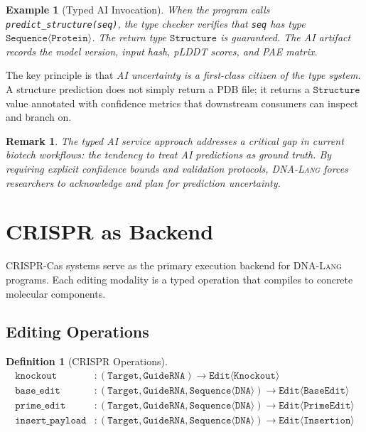 \documentclass[12pt,a4paper]{article}
\newtheorem{definition}[theorem]{Definition}
\newtheorem{example}[theorem]{Example}
\newtheorem{remark}[theorem]{Remark}
\newcommand{\DNALang}{\textsc{DNA-Lang}}
\newcommand{\ty}[1]{\texttt{#1}}
\begin{document}
\begin{example}[Typed AI Invocation]
When the program calls \texttt{predict\_structure(seq)}, the type checker verifies that \texttt{seq} has type $\ty{Sequence}\langle\ty{Protein}\rangle$. The return type $\ty{Structure}$ is guaranteed. The AI artifact records the model version, input hash, pLDDT scores, and PAE matrix.
\end{example}

The key principle is that \emph{AI uncertainty is a first-class citizen of the type system}. A structure prediction does not simply return a PDB file; it returns a $\ty{Structure}$ value annotated with confidence metrics that downstream consumers can inspect and branch on.

\begin{remark}
The typed AI service approach addresses a critical gap in current biotech workflows: the tendency to treat AI predictions as ground truth. By requiring explicit confidence bounds and validation protocols, \DNALang{} forces researchers to acknowledge and plan for prediction uncertainty.
\end{remark}


\section{CRISPR as Backend}
\label{sec:crispr-backend}

CRISPR-Cas systems serve as the primary execution backend for \DNALang{} programs. Each editing modality is a typed operation that compiles to concrete molecular components.

\subsection{Editing Operations}

\begin{definition}[CRISPR Operations]
\begin{align*}
\texttt{knockout} &: (\ty{Target}, \ty{GuideRNA}) \to \ty{Edit}\langle\ty{Knockout}\rangle \\
\texttt{base\_edit} &: (\ty{Target}, \ty{GuideRNA}, \ty{Sequence}\langle\ty{DNA}\rangle) \to \ty{Edit}\langle\ty{BaseEdit}\rangle \\
\texttt{prime\_edit} &: (\ty{Target}, \ty{GuideRNA}, \ty{Sequence}\langle\ty{DNA}\rangle) \to \ty{Edit}\langle\ty{PrimeEdit}\rangle \\
\texttt{insert\_payload} &: (\ty{Target}, \ty{GuideRNA}, \ty{Sequence}\langle\ty{DNA}\rangle) \to \ty{Edit}\langle\ty{Insertion}\rangle
\end{align*}
\end{definition}
\end{document}
